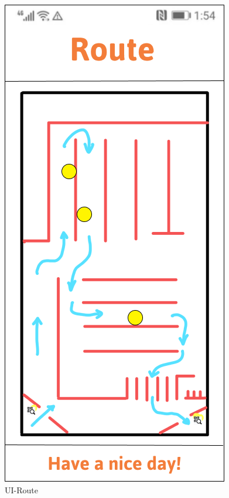 \documentclass[a4paper,12pt]{report}
\begin{document}
\begin{figure}[H]
	\begin{minipage}[t]{0.56\linewidth}
		\centering
		\includegraphics[scale=0.5]{UI-Route.png}
		\caption{UI-Route}
		\label{fig:UI-Route}
	\end{minipage}%
	\begin{minipage}[t]{0.56\linewidth}
		\centering

\end{minipage}
\end{figure}
\end{document}
